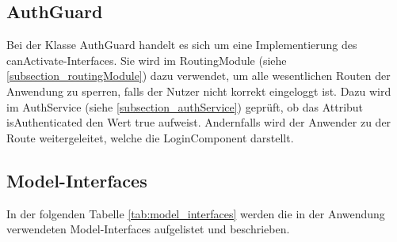 \subsection{AuthGuard}
Bei der Klasse AuthGuard handelt es sich um eine Implementierung des \glqq{}canActivate\grqq{}-Interfaces. Sie wird im RoutingModule (siehe \ref{subsection_routingModule}) dazu verwendet, um alle wesentlichen Routen der Anwendung zu sperren, falls der Nutzer nicht korrekt eingeloggt ist. Dazu wird im AuthService (siehe \ref{subsection_authService}) geprüft, ob das Attribut \glqq{}isAuthenticated\grqq{} den Wert \glqq{}true\grqq{} aufweist. Andernfalls wird der Anwender zu der Route weitergeleitet, welche die LoginComponent darstellt.

\subsection{Model-Interfaces}
In der folgenden Tabelle \ref{tab:model_interfaces} werden die in der Anwendung verwendeten Model-Interfaces aufgelistet und beschrieben.

\newpage

